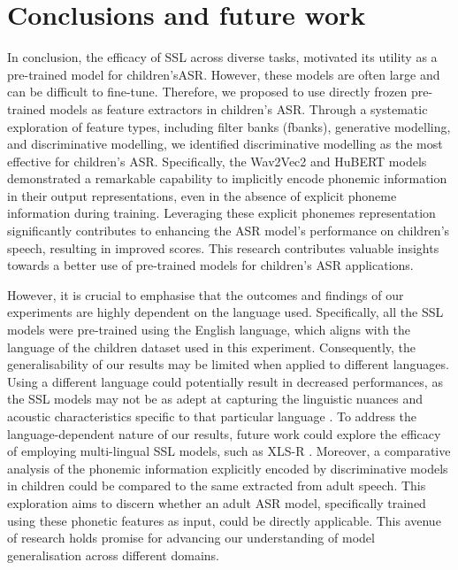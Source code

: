 \section{Conclusions and future work}
In conclusion, the efficacy of \ac{SSL} across diverse tasks, motivated its utility as a pre-trained model for children's\ac{ASR}. However, these models are often large and can be difficult to fine-tune. Therefore, we proposed to use directly frozen pre-trained models as feature extractors in children's \ac{ASR}. Through a systematic exploration of feature types, including filter banks (fbanks), generative modelling, and discriminative modelling, we identified discriminative modelling as the most effective for children's \ac{ASR}. Specifically, the Wav2Vec2 and HuBERT models demonstrated a remarkable capability to implicitly encode phonemic information in their output representations, even in the absence of explicit phoneme information during training. Leveraging these explicit phonemes representation significantly contributes to enhancing the \ac{ASR} model's performance on children's speech, resulting in improved scores. This research contributes valuable insights towards a better use of pre-trained models for children's \ac{ASR} applications.

However, it is crucial to emphasise that the outcomes and findings of our experiments are highly dependent on the language used. Specifically, all the \ac{SSL} models were pre-trained using the English language, which aligns with the language of the children dataset used in this experiment. Consequently, the generalisability of our results may be limited when applied to different languages. Using a different language could potentially result in decreased performances, as the \ac{SSL} models may not be as adept at capturing the linguistic nuances and acoustic characteristics specific to that particular language \cite{phdthesis}. To address the language-dependent nature of our results, future work could explore the efficacy of employing multi-lingual \ac{SSL} models, such as XLS-R \cite{babu2021xlsr}. Moreover, a comparative analysis of the phonemic information explicitly encoded by discriminative models in children could be compared to the same extracted from adult speech. This exploration aims to discern whether an adult \ac{ASR} model, specifically trained using these phonetic features as input, could be directly applicable.  This avenue of research holds promise for advancing our understanding of model generalisation across different domains.

